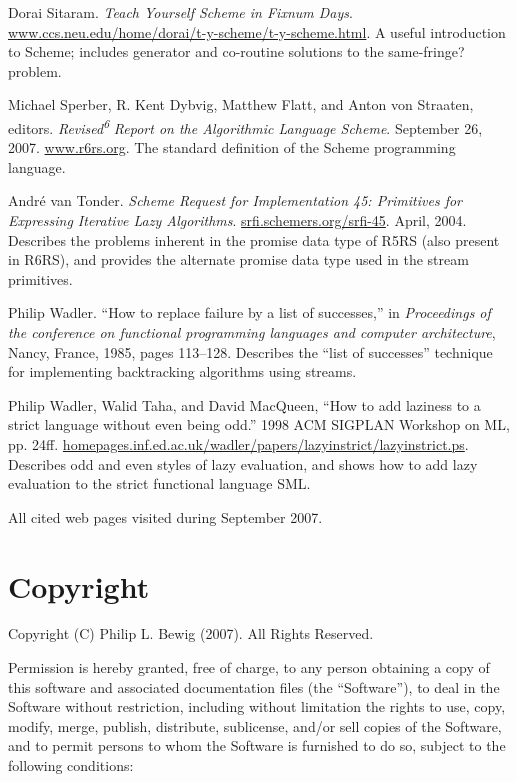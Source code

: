 Dorai Sitaram. \emph{Teach Yourself Scheme in Fixnum Days}.
\href{http://www.ccs.neu.edu/home/dorai/t-y-scheme/t-y-scheme.html}{www.ccs.neu.edu/home/dorai/t-y-scheme/t-y-scheme.html}.
A useful introduction to Scheme; includes generator and co-routine
solutions to the same-fringe? problem.

Michael Sperber, R. Kent Dybvig, Matthew Flatt, and Anton von Straaten,
editors. \emph{Revised}\textsuperscript{\emph{6}} \emph{Report on the
Algorithmic Language Scheme}. September 26, 2007.
\href{http://www.r6rs.org}{www.r6rs.org}. The standard definition of the
Scheme programming language.

André van Tonder. \emph{Scheme Request for Implementation 45: Primitives
for Expressing Iterative Lazy Algorithms}.
\href{http://srfi.schemers.org/srfi-45}{srfi.schemers.org/srfi-45}.
April, 2004. Describes the problems inherent in the promise data type of
R5RS (also present in R6RS), and provides the alternate promise data
type used in the stream primitives.

Philip Wadler. ``How to replace failure by a list of successes,'' in
\emph{Proceedings of the conference on functional programming languages
and computer architecture}, Nancy, France, 1985, pages 113--128.
Describes the ``list of successes'' technique for implementing
backtracking algorithms using streams.

Philip Wadler, Walid Taha, and David MacQueen, ``How to add laziness to
a strict language without even being odd.'' 1998 ACM SIGPLAN Workshop on
ML, pp. 24ff.
\href{http://homepages.inf.ed.ac.uk/wadler/papers/lazyinstrict/lazyinstrict.ps}{homepages.inf.ed.ac.uk/wadler/papers/lazyinstrict/lazyinstrict.ps}.
Describes odd and even styles of lazy evaluation, and shows how to add
lazy evaluation to the strict functional language SML.

All cited web pages visited during September 2007.

\section{Copyright}\label{copyright}

Copyright (C) Philip L. Bewig (2007). All Rights Reserved.

Permission is hereby granted, free of charge, to any person obtaining a
copy of this software and associated documentation files (the
``Software''), to deal in the Software without restriction, including
without limitation the rights to use, copy, modify, merge, publish,
distribute, sublicense, and/or sell copies of the Software, and to
permit persons to whom the Software is furnished to do so, subject to
the following conditions:

